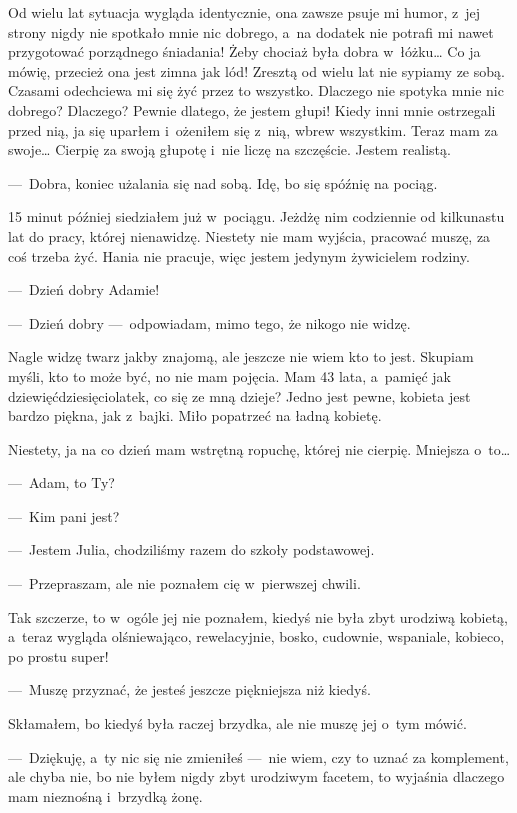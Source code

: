 Od wielu lat sytuacja wygląda identycznie, ona zawsze psuje mi humor, z~jej strony nigdy nie spotkało mnie nic 
dobrego, a~na dodatek nie potrafi mi nawet przygotować porządnego śniadania! Żeby chociaż była dobra w~łóżku… Co ja 
mówię, przecież ona jest zimna jak lód! Zresztą od wielu lat nie sypiamy ze sobą. Czasami odechciewa mi się żyć przez 
to wszystko. Dlaczego nie spotyka mnie nic dobrego? Dlaczego? Pewnie dlatego, że jestem głupi! Kiedy inni mnie 
ostrzegali przed nią, ja się uparłem i~ożeniłem się z~nią, wbrew wszystkim. Teraz mam za swoje… Cierpię za swoją 
głupotę i~nie liczę na szczęście. Jestem realistą.

---~Dobra, koniec użalania się nad sobą. Idę, bo się spóźnię na pociąg.
 
15 minut później siedziałem już w~pociągu. Jeżdżę nim codziennie od kilkunastu lat do pracy, której nienawidzę. 
Niestety nie mam wyjścia, pracować muszę, za coś trzeba żyć. Hania nie pracuje, więc jestem jedynym żywicielem rodziny.

---~Dzień dobry Adamie! 

---~Dzień dobry ---~odpowiadam, mimo tego, że nikogo nie widzę.

Nagle widzę twarz jakby znajomą, ale jeszcze nie wiem kto to jest. Skupiam myśli, kto to może być, no nie mam 
pojęcia. Mam 43 lata, a~pamięć jak dziewięćdziesięciolatek, co się ze mną dzieje? Jedno jest pewne, kobieta jest 
bardzo piękna, jak z~bajki. Miło popatrzeć na ładną kobietę.

Niestety, ja na co dzień mam wstrętną ropuchę, której nie cierpię. Mniejsza o~to…

---~Adam, to Ty?

---~Kim pani jest?

---~Jestem Julia, chodziliśmy razem do szkoły podstawowej.

---~Przepraszam, ale nie poznałem cię w~pierwszej chwili.
 
Tak szczerze, to w~ogóle jej nie poznałem, kiedyś nie była zbyt urodziwą kobietą, a~teraz wygląda olśniewająco, 
rewelacyjnie, bosko, cudownie, wspaniale, kobieco, po prostu super!

---~Muszę przyznać, że jesteś jeszcze piękniejsza niż kiedyś.

Skłamałem, bo kiedyś była raczej brzydka, ale nie muszę jej o~tym mówić.

---~Dziękuję, a~ty nic się nie zmieniłeś ---~nie wiem, czy to uznać za komplement, ale chyba nie, bo nie byłem nigdy 
zbyt urodziwym facetem, to wyjaśnia dlaczego mam nieznośną i~brzydką żonę.
 
